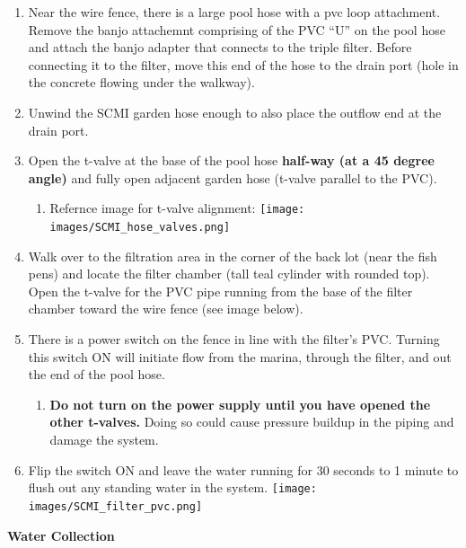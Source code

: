 \documentclass[]{book}
\providecommand{\tightlist}{%
  \setlength{\itemsep}{0pt}\setlength{\parskip}{0pt}}
\begin{document}
\begin{enumerate}
\def\labelenumi{\arabic{enumi}.}
\tightlist
\item
  Near the wire fence, there is a large pool hose with a pvc loop
  attachment. Remove the banjo attachemnt comprising of the PVC ``U'' on
  the pool hose and attach the banjo adapter that connects to the triple
  filter. Before connecting it to the filter, move this end of the hose
  to the drain port (hole in the concrete flowing under the walkway).
\item
  Unwind the SCMI garden hose enough to also place the outflow end at
  the drain port.
\item
  Open the t-valve at the base of the pool hose \textbf{half-way (at a
  45 degree angle)} and fully open adjacent garden hose (t-valve
  parallel to the PVC).

  \begin{enumerate}
  \def\labelenumii{\arabic{enumii}.}
  \tightlist
  \item
    Refernce image for t-valve alignment:
    \texttt{[image: images/SCMI\_hose\_valves.png]}
  \end{enumerate}
\item
  Walk over to the filtration area in the corner of the back lot (near
  the fish pens) and locate the filter chamber (tall teal cylinder with
  rounded top). Open the t-valve for the PVC pipe running from the base
  of the filter chamber toward the wire fence (see image below).
\item
  There is a power switch on the fence in line with the filter's PVC.
  Turning this switch ON will initiate flow from the marina, through the
  filter, and out the end of the pool hose.

  \begin{enumerate}
  \def\labelenumii{\arabic{enumii}.}
  \tightlist
  \item
    \textbf{Do not turn on the power supply until you have opened the
    other t-valves.} Doing so could cause pressure buildup in the piping
    and damage the system.
  \end{enumerate}
\item
  Flip the switch ON and leave the water running for 30 seconds to 1
  minute to flush out any standing water in the system.
  \texttt{[image: images/SCMI\_filter\_pvc.png]}
\end{enumerate}

 \textbf{Water Collection}
\end{document}
